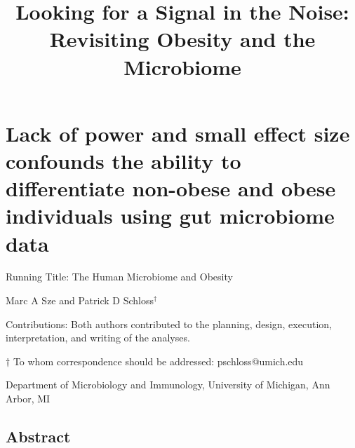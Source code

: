 \documentclass[12pt,]{article}
\title{Looking for a Signal in the Noise: Revisiting Obesity and the Microbiome}
\author{}
\date{}
\begin{document}
\maketitle

\section{Lack of power and small effect size confounds the ability to
differentiate non-obese and obese individuals using gut microbiome
data}\label{lack-of-power-and-small-effect-size-confounds-the-ability-to-differentiate-non-obese-and-obese-individuals-using-gut-microbiome-data}

\begin{center}
\vspace{25mm}


Running Title: The Human Microbiome and Obesity

\vspace{10mm}

Marc A Sze and Patrick D Schloss${^\dagger}$

\vspace{10mm}

Contributions: Both authors contributed to the planning, design, execution, interpretation, and writing of the analyses.


\vspace{20mm}

$\dagger$ To whom correspondence should be addressed: pschloss@umich.edu

Department of Microbiology and Immunology, University of Michigan, Ann Arbor, MI
\end{center}

\newpage

\linenumbers

\subsection{Abstract}\label{abstract}
\end{document}
